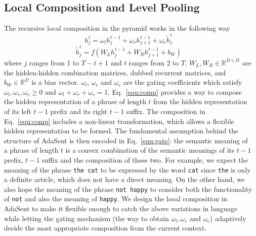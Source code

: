\documentclass{article}
\newcommand{\RR}{\mathbb{R}}
\theoremstyle{definition}
\begin{document}
\subsection{Local Composition and Level Pooling}
The recursive local composition in the pyramid works in the following way
\begin{equation}
h_j^t = \omega_l h_{j}^{t-1} + \omega_r h_{j+1}^{t-1} + \omega_c \tilde{h}_j^t
\label{equ:gate}
\end{equation}
\begin{equation}
\tilde{h}_j^t = f(W_L h_j^{t-1} + W_R h_{j+1}^{t-1} + b_W)
\label{equ:comp}
\end{equation}
where $j$ ranges from 1 to $T-t+1$ and $t$ ranges from $2$ to $T$. $W_L, W_R\in\RR^{D\times D}$ are the hidden-hidden combination matrices, dubbed recurrent matrices, and $b_W\in\RR^D$ is a bias vector. $\omega_l$, $\omega_r$ and $\omega_c$ are the gating coefficients which satisfy $\omega_l, \omega_r, \omega_c\geq 0$ and $\omega_l + \omega_r + \omega_c = 1$. Eq.~\ref{equ:comp} provides a way to compose the hidden representation of a phrase of length $t$ from the hidden representation of its left $t-1$ prefix and its right $t-1$ suffix. The composition in Eq.~\ref{equ:comp} includes a non-linear transformation, which allows a flexible hidden representation to be formed. The fundamental assumption behind the structure of AdaSent is then encoded in Eq.~\ref{equ:gate}: the semantic meaning of a phrase of length $t$ is a convex combination of the semantic meanings of its $t-1$ prefix, $t-1$ suffix and the composition of these two. For example, we expect the meaning of the phrase \texttt{the cat} to be expressed by the word \texttt{cat} since \texttt{the} is only a definite article, which does not have a direct meaning. On the other hand, we also hope the meaning of the phrase \texttt{not happy} to consider both the functionality of \texttt{not} and also the meaning of \texttt{happy}. We design the local composition in AdaSent to make it flexible enough to catch the above variations in language while letting the gating mechanism (the way to obtain $\omega_l,\omega_r$ and $\omega_c$) adaptively decide the most appropriate composition from the current context.
\end{document}
